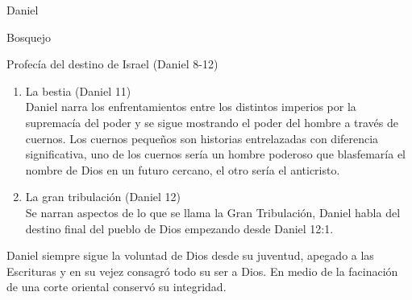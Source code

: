 \begin{section}{Daniel}
\begin{subsection}{Bosquejo}
\begin{subsubsection}{Profecía del destino de Israel (Daniel 8-12)}
\begin{enumerate}
				\item La bestia (Daniel 11)\\
					Daniel narra los enfrentamientos entre los distintos imperios por la supremacía del poder y se sigue mostrando el poder del hombre a través de cuernos. Los cuernos pequeños son historias entrelazadas con diferencia significativa, uno de los cuernos sería un hombre poderoso que blasfemaría el nombre de Dios en un futuro cercano, el otro sería el anticristo.
				\item La gran tribulación (Daniel 12)\\
					Se narran aspectos de lo que se llama la Gran Tribulación, Daniel habla del destino final del pueblo de Dios empezando desde Daniel 12:1.
			\end{enumerate}
			Daniel siempre sigue la voluntad de Dios desde su juventud, apegado a las Escrituras y en su vejez consagró todo su ser a Dios. En medio de la facinación de una corte oriental conservó su integridad.
		\end{subsubsection}
	\end{subsection}
\end{section}
%


